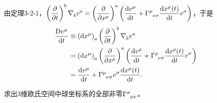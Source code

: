 \begin{xiti}
	\begin{zm}
		由定理3-2-1，$\displaystyle \tensor{\left(\pdv{t}\right)}{^b} \Nabla{b} \tensor{v}{^a} = \tensor{\left(\pdv{x^\mu}\right)}{^a} \left( \dv{\tensor{v}{^\mu}}{t} + \ChristoffelSymbol{\mu}{\nu}{\sigma} \dv{x^\mu(t)}{t} \tensor{v}{^\sigma} \right) $，于是
		\begin{align*}
		\frac{\mathrm{D}\tensor{v}{^\mu}}{\dd{t}} &\equiv \tensor{\left(\dd{x^\mu}\right)}{_a} \tensor{\left(\pdv{t}\right)}{^b} \Nabla{b} \tensor{v}{^a}\\
		&=\tensor{\left(\dd{x^\mu}\right)}{_a} \tensor{\left(\pdv{x^\rho}\right)}{^a} \left( \dv{\tensor{v}{^\rho}}{t} + \ChristoffelSymbol{\rho}{\nu}{\sigma} \dv{x^\rho(t)}{t} \tensor{v}{^\sigma} \right)\\
		&= \dv{\tensor{v}{^\mu}}{t} + \ChristoffelSymbol{\mu}{\nu}{\sigma} \tensor{v}{^\sigma} \dv{x^\mu(t)}{t}  .
		\end{align*}
	\end{zm}

	\item \hypertarget{3.7}{}求出3维欧氏空间中球坐标系的全部非零$\ChristoffelSymbol{\sigma}{\mu}{\nu} $。


\end{xiti}
